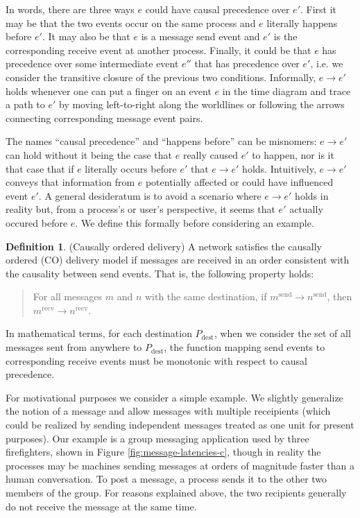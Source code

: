 \documentclass[]             %
{NASA}                       %
\theoremstyle{definition}
\newtheorem{definition}{Definition}[section]
\begin{document}
In words, there are three ways $e$ could have causal precedence over
$e'$.  First it may be that the two events occur on the same process
and $e$ literally happens before $e'$. It may also be that $e$ is a
message send event and $e'$ is the corresponding receive event at
another process. Finally, it could be that $e$ has precedence over
some intermediate event $e''$ that has precedence over $e'$, i.e. we
consider the transitive closure of the previous two
conditions. Informally, $e \to e'$ holds whenever one can put a finger
on an event $e$ in the time diagram and trace a path to $e'$ by moving
left-to-right along the worldlines or following the arrows connecting
corresponding message event pairs.

The names ``causal precedence'' and ``happens before'' can be misnomers: $e
\to e'$ can hold without it being the case that $e$ really caused $e'$
to happen, nor is it that case that if $e$ literally occurs before
$e'$ that $e \to e'$ holds. Intuitively, $e \to e'$ conveys that
information from $e$ potentially affected or could have influenced
event $e'$. A general desideratum is to avoid a scenario where $e \to
e'$ holds in reality but, from a process's or user's perspective, it
seems that $e'$ actually occured before $e$. We define this formally
before considering an example.

\begin{definition}(Causally ordered delivery)
  \label{def:causalorder}
  A network satisfies the causally ordered (CO) delivery model if
  messages are received in an order consistent with the causality
  between send events. That is, the following property holds:
  \begin{quote}
  For all messages $m$ and $n$ with the same destination, if
  $m^\textrm{send} \to n^\textrm{send}$, then $m^\textrm{recv} \to
  n^\textrm{recv}$.
  \end{quote}
  In mathematical terms, for each destination $P_\mathrm{dest}$, when
  we consider the set of all messages sent from anywhere to
  $P_\mathrm{dest}$, the function mapping send events to corresponding
  receive events must be monotonic with respect to causal
  precedence.
\end{definition}

For motivational purposes we consider a simple example. We slightly
generalize the notion of a message and allow messages with multiple
receipients (which could be realized by sending independent messages
treated as one unit for present purposes). Our example is a group
messaging application used by three firefighters, shown in Figure
\ref{fig:message-latencies-c}, though in reality the processes may be
machines sending messages at orders of magnitude faster than a human
conversation. To post a message, a process sends it to the other two
members of the group. For reasons explained above, the two recipients
generally do not receive the message at the same time.
\end{document}
